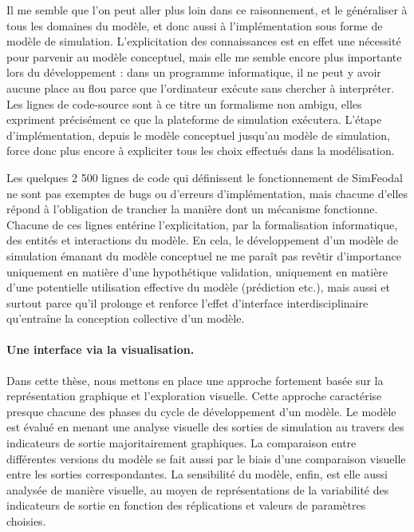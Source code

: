 Il me semble que l'on peut aller plus loin dans ce raisonnement, et le généraliser à tous les domaines du modèle, et donc aussi à l'implémentation sous forme de modèle de simulation.
L'explicitation des connaissances est en effet une nécessité pour parvenir au modèle conceptuel, mais elle me semble encore plus importante lors du développement :
	dans un programme informatique, il ne peut y avoir aucune place au flou parce que l'ordinateur exécute sans chercher à interpréter.
Les lignes de code-source sont à ce titre un formalisme non ambigu, elles expriment précisément ce que la plateforme de simulation exécutera.
L'étape d'implémentation, depuis le modèle conceptuel jusqu'au modèle de simulation, force donc plus encore à expliciter tous les choix effectués dans la modélisation.

Les quelques 2 500 lignes de code qui définissent le fonctionnement de SimFeodal ne sont pas exemptes de bugs ou d'erreurs d'implémentation, mais chacune d'elles répond à l'obligation de trancher la manière dont un mécanisme fonctionne.
Chacune de ces lignes entérine l'explicitation, par la formalisation informatique, des entités et interactions du modèle.
En cela, le développement d'un modèle de simulation émanant du modèle conceptuel ne me paraît pas revêtir d'importance uniquement en matière d'une hypothétique validation, uniquement en matière d'une potentielle utilisation effective du modèle (prédiction etc.), mais aussi et surtout parce qu'il prolonge et renforce l'effet d'interface interdisciplinaire qu'entraîne la conception collective d'un modèle.

\paragraph{Une interface via la visualisation.}

Dans cette thèse, nous mettons en place une approche fortement basée sur la représentation graphique et l'exploration visuelle.
Cette approche caractérise presque chacune des phases du cycle de développement d'un modèle.
Le modèle est évalué en menant une analyse visuelle des sorties de simulation au travers des indicateurs de sortie majoritairement graphiques.
La comparaison entre différentes versions du modèle se fait aussi par le biais d'une comparaison visuelle entre les sorties correspondantes.
La sensibilité du modèle, enfin, est elle aussi analysée de manière visuelle, au moyen de représentations de la variabilité des indicateurs de sortie en fonction des réplications et valeurs de paramètres choisies.

